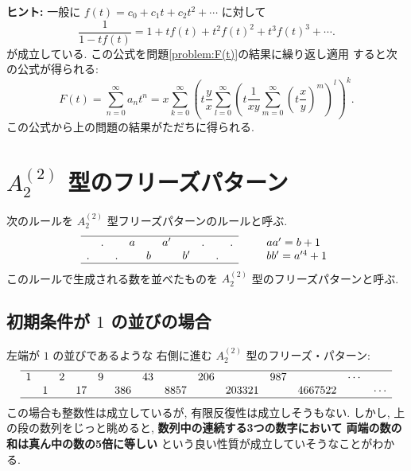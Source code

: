 \documentclass[12pt,twoside,dvipdfm]{jarticle}
\theoremstyle{definition} %
\theoremstyle{definition} %
\theoremstyle{definition} %
\numberwithin{theorem}{section}
\numberwithin{equation}{section}
\numberwithin{figure}{section}
\numberwithin{table}{section}
\newcommand\problemref[1]{問題\ref{#1}}
\begin{document}
\noindent
{\bf ヒント:} 一般に $f(t)=c_0+c_1t+c_2t^2+\cdots$ に対して
\begin{equation*}
\frac{1}{1-tf(t)} = 1+ tf(t) + t^2f(t)^2 + t^3f(t)^3 + \cdots.
\end{equation*}
が成立している. この公式を\problemref{problem:F(t)}の結果に繰り返し適用
すると次の公式が得られる:
\begin{equation*}
F(t)=\sum_{n=0}^\infty a_n t^n
=x
\sum_{k=0}^\infty\left(
 t\frac{y}{x}
 \sum_{l=0}^\infty\left(
  t\frac{1}{xy}
  \sum_{m=0}^\infty \left(t\frac{x}{y}\right)^m
 \right)^l
\right)^k.
\end{equation*}
この公式から上の問題の結果がただちに得られる.


\section{$A^{(2)}_2$ 型のフリーズパターン}
\label{sec:A^{(2)}_2}

次のルールを $A^{(2)}_2$ 型フリーズパターンのルールと呼ぶ.
\begin{equation*}
\begin{array}{cccccccccc} \hline
   & . &   & a &   & a'&   & . &   & . \\
 . &   & . &   & b &   & b'&   & . &   \\ \hline
\end{array}
\qquad
\begin{array}{l}
aa' = b  +1 \\
bb' = a'^4 +1 \\
\end{array}
\end{equation*}
このルールで生成される数を並べたものを $A^{(2)}_2$ 型のフリーズパターンと呼ぶ.


\subsection{初期条件が $1$ の並びの場合}

左端が $1$ の並びであるような
右側に進む $A^{(2)}_2$ 型のフリーズ・パターン:
\begin{equation*}
\begin{array}{cccccccccccccccccc}\hline
1 &   & 2 &    & 9 &     & 43 &      & 206 &        & 987 &       &\cdots&      \\
  & 1 &   & 17 &   & 386 &    & 8857 &     & 203321 &     &4667522&      &\cdots\\ \hline
\end{array}
\end{equation*}
この場合も整数性は成立しているが, 
有限反復性は成立しそうもない.
しかし, 上の段の数列をじっと眺めると, 
{\bf 数列中の連続する3つの数字において
両端の数の和は真ん中の数の5倍に等しい}
という良い性質が成立していそうなことがわかる.
\end{document}
